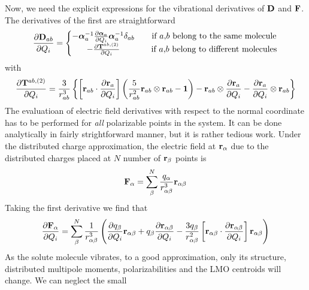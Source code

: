 \documentclass[a4paper,titlepage,twoside,fleqn,12pt]{book}
\newcommand{\BM}[1]{\bm{#1}}
\newcommand{\fderiv}[2]{\ensuremath{
\frac{\partial #1}{\partial #2}}}
\begin{document}
\begin{refsection}
Now, we need the explicit expressions for the vibrational
derivatives of $\bf D$ and $\bf F$. The derivatives of the first are straightforward
%
\begin{equation}
\fderiv{{\bf D}_{ab}}{Q_i} = 
\left\{\begin{matrix}               
-{\BM \alpha}_a^{-1} \fderiv{{\BM \alpha}_a}{Q_i} {\BM \alpha}_a^{-1} 
                       \delta_{ab} && \text{if $a$,$b$ belong to the same molecule} \\
-\fderiv{{\bf T}^{ab,(2)}}{Q_i}  && \text{if $a$,$b$ belong to different molecules}
\end{matrix}\right. 
\end{equation}
%
with
%
\begin{equation}
\fderiv{{\bf T}^{ab,(2)}}{Q_i} = \frac{3}{r_{ab}^3} 
       \left\{ 
           \left[ 
                {\bf r}_{ab} \cdot \fderiv{{\bf r}_{a}}{Q_i} 
           \right]
           \left(
                 \frac{5}{r_{ab}^2} {\bf r}_{ab} \otimes {\bf r}_{ab} - {\bf 1}
           \right) -
                 {\bf r}_{ab} \otimes \fderiv{{\bf r}_{a}}{Q_i} - \fderiv{{\bf r}_{a}}{Q_i} \otimes {\bf r}_{ab}
       \right\}
\end{equation}
%
The evaluatioan of electric field derivatives with respect to the normal coordinate 
has to be performed for \emph{all} polarizable points in the system. 
It can be done analytically
in fairly strightforward manner, but it is rather tedious work. 
Under the distributed charge approximation, 
the electric field at ${\bf r}_\alpha$ due to the 
distributed charges placed at $N$ number of ${\bf r}_\beta$ points is
%
\begin{equation}
{\bf F}_\alpha = \sum_\beta^N \frac{q_\alpha}{r_{\alpha\beta}^3} {\bf r}_{\alpha\beta}
\end{equation}
%
Taking the first derivative we find that
%
\begin{equation}
\fderiv{{\bf F}_\alpha}{Q_i} = \sum_\beta^N \frac{1}{r_{\alpha\beta}^3}  
        \left(
            \fderiv{q_\beta}{Q_i}{\bf r}_{\alpha\beta} + q_\beta \fderiv{{\bf r}_{\alpha\beta}}{Q_i} - \frac{3q_\beta}{r_{\alpha\beta}^2} 
                \left[ 
                     {\bf r}_{\alpha\beta} \cdot \fderiv{{\bf r}_{\alpha\beta}}{Q_i} 
                \right] {\bf r}_{\alpha\beta}
        \right)
\end{equation}
%
As the solute molecule vibrates, to a good approximation, 
only its structure, distributed multipole moments, polarizabilities 
and the LMO centroids will change. We can neglect the small 

\end{refsection}
\end{document}
